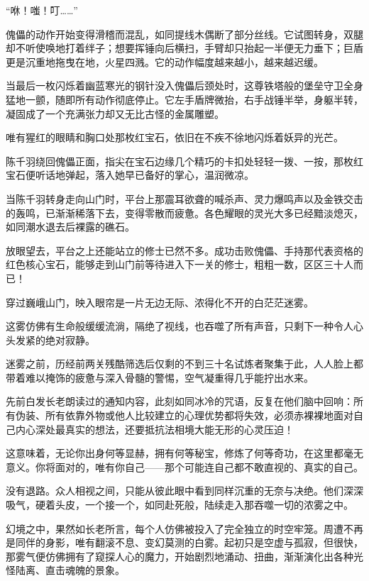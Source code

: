 “咻！嗤！叮……”

傀儡的动作开始变得滑稽而混乱，如同提线木偶断了部分丝线。它试图转身，双腿却不听使唤地打着绊子；想要挥锤向后横扫，手臂却只抬起一半便无力垂下；巨盾更是沉重地拖曳在地，火星四溅。它的动作幅度越来越小，越来越迟缓。

当最后一枚闪烁着幽蓝寒光的钢针没入傀儡后颈处时，这尊铁塔般的堡垒守卫全身猛地一颤，随即所有动作彻底停止。它左手盾牌微抬，右手战锤半举，身躯半转，凝固成了一个充满张力却又无比古怪的金属雕塑。

唯有猩红的眼睛和胸口处那枚红宝石，依旧在不疾不徐地闪烁着妖异的光芒。

陈千羽绕回傀儡正面，指尖在宝石边缘几个精巧的卡扣处轻轻一拨、一按，那枚红宝石便听话地弹起，落入她早已备好的掌心，温润微凉。

当陈千羽转身走向山门时，平台上那震耳欲聋的喊杀声、灵力爆鸣声以及金铁交击的轰鸣，已渐渐稀落下去，变得零散而疲惫。各色耀眼的灵光大多已经黯淡熄灭，如同潮水退去后裸露的礁石。

放眼望去，平台之上还能站立的修士已然不多。成功击败傀儡、手持那代表资格的红色核心宝石，能够走到山门前等待进入下一关的修士，粗粗一数，区区三十人而已！

\vspace{2em}

穿过巍峨山门，映入眼帘是一片无边无际、浓得化不开的白茫茫迷雾。

这雾仿佛有生命般缓缓流淌，隔绝了视线，也吞噬了所有声音，只剩下一种令人心头发紧的绝对寂静。

迷雾之前，历经前两关残酷筛选后仅剩的不到三十名试炼者聚集于此，人人脸上都带着难以掩饰的疲惫与深入骨髓的警惕，空气凝重得几乎能拧出水来。

先前白发长老朗读过的通知内容，此刻如同冰冷的咒语，反复在他们脑中回响：所有伪装、所有依靠外物或他人比较建立的心理优势都将失效，必须赤裸裸地面对自己内心深处最真实的想法，还要抵抗法相境大能无形的心灵压迫！

这意味着，无论你出身何等显赫，拥有何等秘宝，修炼了何等奇功，在这里都毫无意义。你将面对的，唯有你自己——那个可能连自己都不敢直视的、真实的自己。

没有退路。众人相视之间，只能从彼此眼中看到同样沉重的无奈与决绝。他们深深吸气，硬着头皮，一个接一个，如同赴死般，陆续走入那吞噬一切的浓雾之中。

幻境之中，果然如长老所言，每个人仿佛被投入了完全独立的时空牢笼。周遭不再是同伴的身影，唯有翻滚不息、变幻莫测的白雾。起初只是空虚与孤寂，但很快，那雾气便仿佛拥有了窥探人心的魔力，开始剧烈地涌动、扭曲，渐渐演化出各种光怪陆离、直击魂魄的景象。

